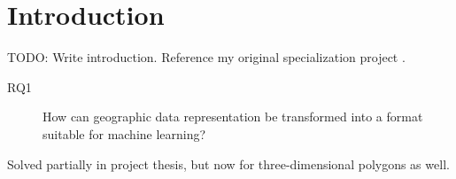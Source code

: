 \chapter{Introduction}

TODO: Write introduction.
Reference my original specialization project \cite{specialization-project}.

\begin{description}
  \item[RQ1] How can geographic data representation be transformed into a format suitable for machine learning?
\end{description}

Solved partially in project thesis, but now for three-dimensional polygons as well.
